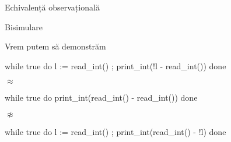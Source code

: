\documentclass[xcolor=pdftex,romanian,colorlinks]{beamer}
\begin{document}
\begin{section}{Echivalență observațională}
\begin{subsection}{Bisimulare}
\begin{frame}[fragile]{Vrem putem să demonstrăm}
\begin{minipage}{.25\columnwidth}
\begin{asciiml}
while true do 
  l := read_int() ;
  print_int(!l
          - read_int())
done
\end{asciiml}
\end{minipage}
\hfill{\Large $\approx$}\hfill\begin{minipage}{.25\columnwidth}
\begin{asciiml}


while true do
  print_int(read_int()
          - read_int())
done

\end{asciiml}
\end{minipage}
\hfill{\Large $\not\approx$}\hfill\begin{minipage}{.25\columnwidth}
\begin{asciiml}


while true do
  l := read_int() ;
  print_int(read_int()
          - !l)
done
\end{asciiml}
\end{minipage}
\hfill\ 

\end{frame}

\end{subsection}

\end{section}
\end{document}
